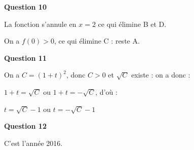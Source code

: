 \documentclass[10pt]{article}
\begin{document}
\textbf{Question 10}

La fonction s'annule en $x = 2$ ce qui élimine B et D.

On a $f(0) > 0$, ce qui élimine C : reste A.

\textbf{Question 11}

On a $C = (1 + t)^2$, donc $C > 0$ et $\sqrt{C}$ existe : on a donc :

$1 + t = \sqrt{C}$ ou $1 + t = - \sqrt{C}$, d'où :

$t = \sqrt{C} - 1$ ou $t = - \sqrt{C} - 1$

\textbf{Question 12}

C'est l'année 2016.

\bigskip
\end{document}
